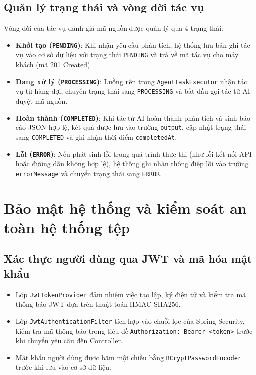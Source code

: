 \documentclass[12pt,a4paper]{report}
\begin{document}
\subsection{Quản lý trạng thái và vòng đời tác vụ}
Vòng đời của tác vụ đánh giá mã nguồn được quản lý qua 4 trạng thái:
\begin{itemize}
    \item \textbf{Khởi tạo (\texttt{PENDING})}: Khi nhận yêu cầu phân tích, hệ thống lưu bản ghi tác vụ vào cơ sở dữ liệu với trạng thái \texttt{PENDING} và trả về mã tác vụ cho máy khách (mã 201 Created).
    \item \textbf{Đang xử lý (\texttt{PROCESSING})}: Luồng nền trong \texttt{AgentTaskExecutor} nhận tác vụ từ hàng đợi, chuyển trạng thái sang \texttt{PROCESSING} và bắt đầu gọi tác tử AI duyệt mã nguồn.
    \item \textbf{Hoàn thành (\texttt{COMPLETED})}: Khi tác tử AI hoàn thành phân tích và sinh báo cáo JSON hợp lệ, kết quả được lưu vào trường \texttt{output}, cập nhật trạng thái sang \texttt{COMPLETED} và ghi nhận thời điểm \texttt{completedAt}.
    \item \textbf{Lỗi (\texttt{ERROR})}: Nếu phát sinh lỗi trong quá trình thực thi (như lỗi kết nối API hoặc đường dẫn không hợp lệ), hệ thống ghi nhận thông điệp lỗi vào trường \texttt{errorMessage} và chuyển trạng thái sang \texttt{ERROR}.
\end{itemize}

\section{Bảo mật hệ thống và kiểm soát an toàn hệ thống tệp}

\subsection{Xác thực người dùng qua JWT và mã hóa mật khẩu}
\begin{itemize}
    \item Lớp \texttt{JwtTokenProvider} đảm nhiệm việc tạo lập, ký điện tử và kiểm tra mã thông báo JWT dựa trên thuật toán HMAC-SHA256.
    \item Lớp \texttt{JwtAuthenticationFilter} tích hợp vào chuỗi lọc của Spring Security, kiểm tra mã thông báo trong tiêu đề \texttt{Authorization: Bearer <token>} trước khi chuyển yêu cầu đến Controller.
    \item Mật khẩu người dùng được băm một chiều bằng \texttt{BCryptPasswordEncoder} trước khi lưu vào cơ sở dữ liệu.
\end{itemize}
\end{document}
